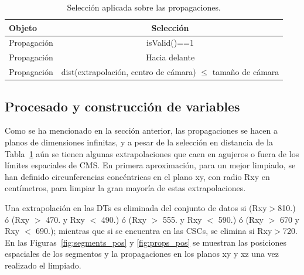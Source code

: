 \begin{table}[htbp]
  \begin{center}
    {\normalsize
      \begin{tabular} {lc}
        \hline
        \hline
        Objeto & Selecci\'on \\
        \hline
        Propagaci\'on          & isValid()==1                                                                 \\
        Propagaci\'on          & Hacia delante                                                                \\
        Propagaci\'on          & dist(extrapolaci\'on, centro de c\'amara) $\leq$ tama\~no de c\'amara      \\
        \hline
      \end{tabular}
    }
    \caption{Selecci\'on aplicada sobre las propagaciones.}
    \label{tab:prop_sel}
  \end{center}
\end{table}




\subsection{Procesado y construcci\'on de variables}\label{sec:procesado}

Como se ha mencionado en la secci\'on anterior, las propagaciones se hacen a planos de dimensiones infinitas, y a pesar de la selecci\'on en distancia de la Tabla~\ref{tab:prop_sel} a\'un se tienen algunas extrapolaciones que caen en agujeros o fuera de los l\'imites espaciales de CMS. En primera aproximaci\'on, para un mejor limpiado, se han definido circunferencias conc\'entricas en el plano xy, con radio Rxy en cent\'imetros, para limpiar la gran mayor\'ia de estas extrapolaciones. 

Una extrapolaci\'on en las DTs es eliminada del conjunto de datos si (Rxy$>$810.) \'o (Rxy $>$ 470. y Rxy $<$ 490.) \'o (Rxy $>$ 555. y  Rxy $<$ 590.) \'o (Rxy $>$ 670 y Rxy $<$ 690.); mientras que si se encuentra en las CSCs, se elimina si Rxy$>$720. En las Figuras~\ref{fig:segments_pos} y \ref{fig:props_pos} se muestran las posiciones espaciales de los segmentos y la propagaciones en los planos xy y xz una vez realizado el limpiado. \\


